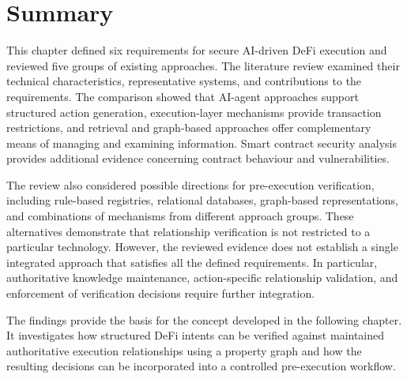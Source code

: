 


\section{Summary}
\label{sec:sota_summary}

This chapter defined six requirements for secure AI-driven
DeFi execution and reviewed five groups of existing
approaches. The literature review examined their technical
characteristics, representative systems, and contributions
to the requirements. The comparison showed that AI-agent
approaches support structured action generation, execution-layer
mechanisms provide transaction restrictions, and retrieval
and graph-based approaches offer complementary means of
managing and examining information. Smart contract security
analysis provides additional evidence concerning contract
behaviour and vulnerabilities.

The review also considered possible directions for
pre-execution verification, including rule-based registries,
relational databases, graph-based representations, and
combinations of mechanisms from different approach groups.
These alternatives demonstrate that relationship verification
is not restricted to a particular technology. However,
the reviewed evidence does not establish a single integrated
approach that satisfies all the defined requirements.
In particular, authoritative knowledge maintenance,
action-specific relationship validation, and enforcement
of verification decisions require further integration.

The findings provide the basis for the concept developed
in the following chapter. It investigates how structured
DeFi intents can be verified against maintained authoritative
execution relationships using a property graph and how
the resulting decisions can be incorporated into a
controlled pre-execution workflow.
